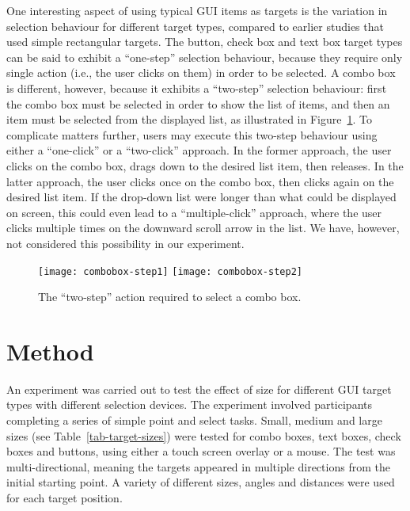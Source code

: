 \documentclass[a4paper]{article}
\begin{document}
One interesting aspect of using typical GUI items as targets is the
variation in selection behaviour for different target types, compared to
earlier studies that used simple rectangular targets. The button, check
box and text box target types can be said to exhibit a ``one-step''
selection behaviour, because they require only single action (i.e., the
user clicks on them) in order to be selected. A combo box is different,
however, because it exhibits a ``two-step'' selection behaviour: first
the combo box must be selected in order to show the list of items, and
then an item must be selected from the displayed list, as illustrated in
Figure~\ref{fig-combo-box}. To complicate matters further, users may
execute this two-step behaviour using either a ``one-click'' or a
``two-click'' approach. In the former approach, the user clicks on the
combo box, drags down to the desired list item, then releases. In the
latter approach, the user clicks once on the combo box, then clicks
again on the desired list item. If the drop-down list were longer than
what could be displayed on screen, this could even lead to a
``multiple-click'' approach, where the user clicks multiple times on the
downward scroll arrow in the list. We have, however, not considered this
possibility in our experiment.


\begin{figure}[ht]
	\centering
	\texttt{[image: combobox-step1]}\quad\quad\quad
	\texttt{[image: combobox-step2]}
	\caption{The ``two-step'' action required to select a combo box.}
	\label{fig-combo-box}
\end{figure}



\section{Method}
\label{sec-method}

An experiment was carried out to test the effect of size for different
GUI target types with different selection devices. The experiment
involved participants completing a series of simple point and select
tasks. Small, medium and large sizes (see Table~\ref{tab-target-sizes})
were tested for combo boxes, text boxes, check boxes and buttons, using
either a touch screen overlay or a mouse. The test was
multi-directional, meaning the targets appeared in multiple directions
from the initial starting point. A variety of different sizes, angles
and distances were used for each target position.
\end{document}
